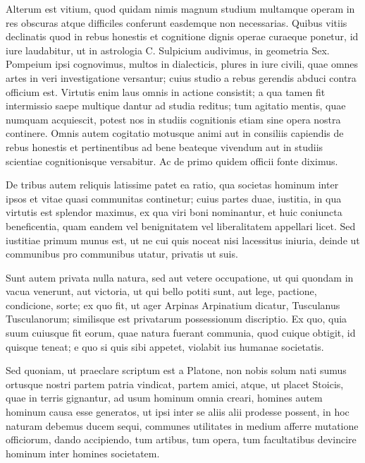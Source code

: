  Alterum est vitium, quod quidam nimis magnum studium multamque operam in res obscuras atque difficiles conferunt easdemque non necessarias. Quibus vitiis declinatis quod in rebus honestis et cognitione dignis operae curaeque ponetur, id iure laudabitur, ut in astrologia C. Sulpicium audivimus, in geometria Sex. Pompeium ipsi cognovimus, multos in dialecticis, plures in iure civili, quae omnes artes in veri investigatione versantur; cuius studio a rebus gerendis abduci contra officium est. Virtutis enim laus omnis in actione consistit; a qua tamen fit intermissio saepe multique dantur ad studia reditus; tum agitatio mentis, quae numquam acquiescit, potest nos in studiis cognitionis etiam sine opera nostra continere. Omnis autem cogitatio motusque animi aut in consiliis capiendis de rebus honestis et pertinentibus ad bene beateque vivendum aut in studiis scientiae cognitionisque versabitur. Ac de primo quidem officii fonte diximus.

 De tribus autem reliquis latissime patet ea ratio, qua societas hominum inter ipsos et vitae quasi communitas continetur; cuius partes duae, iustitia, in qua virtutis est splendor maximus, ex qua viri boni nominantur, et huic coniuncta beneficentia, quam eandem vel benignitatem vel liberalitatem appellari licet. Sed iustitiae primum munus est, ut ne cui quis noceat nisi lacessitus iniuria, deinde ut communibus pro communibus utatur, privatis ut suis.

 Sunt autem privata nulla natura, sed aut vetere occupatione, ut qui quondam in vacua venerunt, aut victoria, ut qui bello potiti sunt, aut lege, pactione, condicione, sorte; ex quo fit, ut ager Arpinas Arpinatium dicatur, Tusculanus Tusculanorum; similisque est privatarum possessionum discriptio. Ex quo, quia suum cuiusque fit eorum, quae natura fuerant communia, quod cuique obtigit, id quisque teneat; e quo si quis sibi appetet, violabit ius humanae societatis.

 Sed quoniam, ut praeclare scriptum est a Platone, non nobis solum nati sumus ortusque nostri partem patria vindicat, partem amici, atque, ut placet Stoicis, quae in terris gignantur, ad usum hominum omnia creari, homines autem hominum causa esse generatos, ut ipsi inter se aliis alii prodesse possent, in hoc naturam debemus ducem sequi, communes utilitates in medium afferre mutatione officiorum, dando accipiendo, tum artibus, tum opera, tum facultatibus devincire hominum inter homines societatem.

